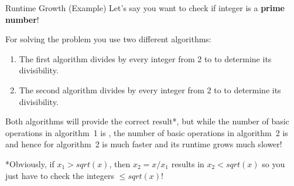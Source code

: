 \begin{vbframe}{Runtime Growth (Example)}
Let's say you want to check if integer  is a \textbf{prime number}!

\lz

For solving the problem you use two different algorithms:
\begin{enumerate}
  \item The first algorithm divides  by every integer from 2 to  to determine its divisibility.
  \item The second algorithm divides  by every integer from 2 to  to determine its divisibility.
\end{enumerate}

\lz

Both algorithms will provide the correct result*, but while the number of basic operations in algorithm~1 is , the number of basic operations in algorithm~2 is  and hence for  algorithm~2 is much faster and its runtime grows much slower!

\lz

\begin{footnotesize}
*Obviously, if $x_1 > sqrt(x)$, then $x_2 = x / x_1$ results in $x_2 < sqrt(x)$ so you just have to check the integers $\le sqrt(x)$!
\end{footnotesize}

\end{vbframe}



\endlecture

